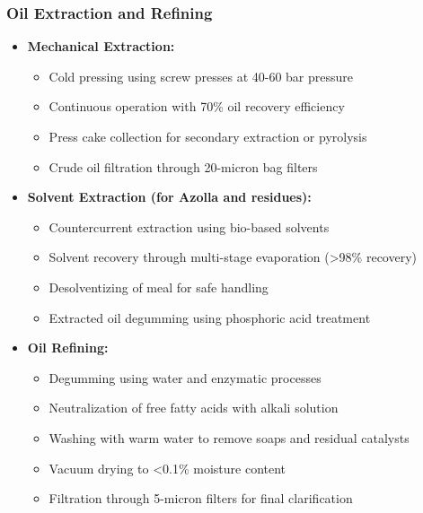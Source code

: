 \subsubsection{Oil Extraction and Refining}
\begin{itemize}
    \item \textbf{Mechanical Extraction:}
    \begin{itemize}
        \item Cold pressing using screw presses at 40-60 bar pressure
        \item Continuous operation with 70\% oil recovery efficiency
        \item Press cake collection for secondary extraction or pyrolysis
        \item Crude oil filtration through 20-micron bag filters
    \end{itemize}
    
    \item \textbf{Solvent Extraction (for Azolla and residues):}
    \begin{itemize}
        \item Countercurrent extraction using bio-based solvents
        \item Solvent recovery through multi-stage evaporation (>98\% recovery)
        \item Desolventizing of meal for safe handling
        \item Extracted oil degumming using phosphoric acid treatment
    \end{itemize}
    
    \item \textbf{Oil Refining:}
    \begin{itemize}
        \item Degumming using water and enzymatic processes
        \item Neutralization of free fatty acids with alkali solution
        \item Washing with warm water to remove soaps and residual catalysts
        \item Vacuum drying to <0.1\% moisture content
        \item Filtration through 5-micron filters for final clarification
    \end{itemize}
\end{itemize}

